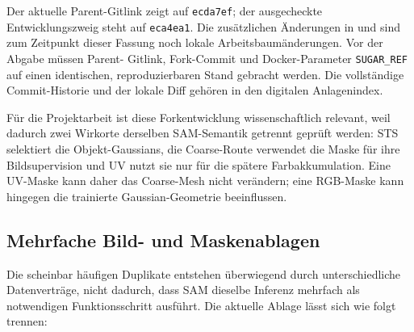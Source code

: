 Der aktuelle Parent-Gitlink zeigt auf \texttt{ecda7ef}; der ausgecheckte
Entwicklungszweig steht auf \texttt{eca4ea1}. Die zusätzlichen Änderungen in
 und  sind zum Zeitpunkt dieser
Fassung noch lokale Arbeitsbaumänderungen. Vor der Abgabe müssen Parent-
Gitlink, Fork-Commit und Docker-Parameter \texttt{SUGAR\_REF} auf einen
identischen, reproduzierbaren Stand gebracht werden. Die vollständige
Commit-Historie und der lokale Diff gehören in den digitalen Anlagenindex.

Für die Projektarbeit ist diese Forkentwicklung wissenschaftlich relevant,
weil dadurch zwei Wirkorte derselben SAM-Semantik getrennt geprüft werden:
STS selektiert die Objekt-Gaussians, die Coarse-Route verwendet die Maske für
ihre Bildsupervision und UV nutzt sie nur für die spätere Farbakkumulation.
Eine UV-Maske kann daher das Coarse-Mesh nicht verändern; eine RGB-Maske kann
hingegen die trainierte Gaussian-Geometrie beeinflussen.

\subsection{Mehrfache Bild- und Maskenablagen}

Die scheinbar häufigen Duplikate entstehen überwiegend durch unterschiedliche
Datenverträge, nicht dadurch, dass SAM dieselbe Inferenz mehrfach als
notwendigen Funktionsschritt ausführt. Die aktuelle Ablage lässt sich wie folgt
trennen:

